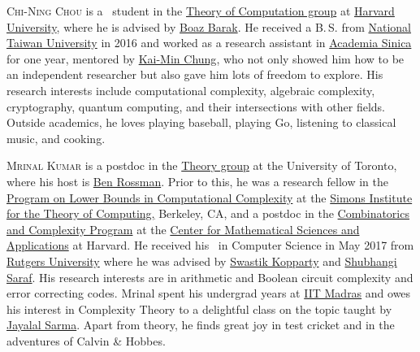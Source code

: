 \documentclass{toc}
\begin{document}
%
%
%
%
%
%
%
%
%
%
%
%
%
%
\begin{tocaboutauthors}
\begin{tocabout}[chou]
	\textsc{Chi-Ning Chou} is a \phd\ student in the \href{http://toc.seas.harvard.edu/}{Theory of Computation group} at \href{http://www.seas.harvard.edu/}{Harvard University}, where he is advised by \href{http://boazbarak.org}{Boaz Barak}. He received a B.\,S. from \href{https://www.csie.ntu.edu.tw}{National Taiwan University} in 2016 and worked as a research assistant in \href{http://iis.sinica.edu.tw}{Academia Sinica} for one year, mentored by \href{http://www.iis.sinica.edu.tw/~kmchung/}{Kai-Min Chung}, who not only showed him how to be an independent researcher but also gave him lots of freedom to explore. His research interests include computational complexity, algebraic complexity, cryptography, quantum computing, and their intersections with other fields. Outside academics, he loves playing baseball, playing Go, listening to classical music, and cooking.
\end{tocabout}
\begin{tocabout}[kumar]
  \textsc{Mrinal Kumar} is a postdoc in the \href{http://www.cs.toronto.edu/theory/}{Theory group} at
the %
University of Toronto, where his host is \href{http://www.math.toronto.edu/rossman/}{Ben Rossman}.  Prior to this, he was a  research fellow in the \href{https://simons.berkeley.edu/programs/complexity2018}{Program on Lower Bounds in Computational Complexity} at the \href{https://simons.berkeley.edu/}{Simons Institute for the Theory of
%
%
%
Computing,} Berkeley, CA,   %
and a postdoc in the \href{http://cmsa.fas.harvard.edu/combinatorics/}{Combinatorics and Complexity Program} at the \href{http://cmsa.fas.harvard.edu/}{Center for Mathematical Sciences and Applications} at Harvard. He received his \phd\ in Computer Science in May 2017 from \href{https://www.rutgers.edu}{Rutgers University} where he was advised by \href{http://www.math.rutgers.edu/~sk1233/}{Swastik Kopparty} and \href{https://www.math.rutgers.edu/~ss1984/}{Shubhangi Saraf}. His research interests are in arithmetic and Boolean circuit complexity and
error correcting codes.
Mrinal spent his undergrad years at \href{https://www.iitm.ac.in/}{IIT Madras} and owes his interest in Complexity Theory to a delightful class on the topic taught by \href{http://www.cse.iitm.ac.in/~jayalal/}{Jayalal Sarma}. Apart from theory, he finds great joy in test cricket and in the adventures of Calvin \& Hobbes.
\end{tocabout}
\begin{tocabout}[solomon]

\end{tocabout}
\end{tocaboutauthors}
\end{document}
